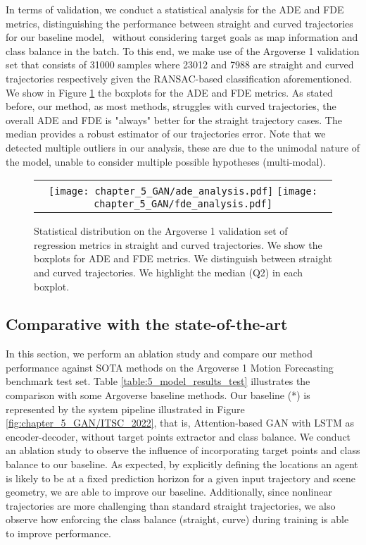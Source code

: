 In terms of validation, we conduct a statistical analysis for the ADE and FDE metrics, distinguishing the performance between straight and curved trajectories for our baseline model, \ie \ without considering target goals as map information and class balance in the batch. To this end, we make use of the Argoverse 1 validation set that consists of 31000 samples where 23012 and 7988 are straight and curved trajectories respectively given the RANSAC-based classification aforementioned. We show in Figure \ref{fig:chapter_5_GAN/boxplots} the boxplots for the ADE and FDE metrics. As stated before, our method, as most methods, struggles with curved trajectories, the overall ADE and FDE is "always" better for the straight trajectory cases. The median provides a robust estimator of our trajectories error. Note that we detected multiple outliers in our analysis, these are due to the unimodal nature of the model, unable to consider multiple possible hypotheses (multi-modal). 

\begin{figure}[!ht]
	\centering
	\setlength{\tabcolsep}{2.0pt}
	\begin{tabular}{c}
		\texttt{[image: chapter\_5\_GAN/ade\_analysis.pdf]} %
		\texttt{[image: chapter\_5\_GAN/fde\_analysis.pdf]}\tabularnewline
	\end{tabular}
	\caption[Statistical distribution on the Argoverse 1 validation set of regression metrics in straight and curved trajectories]{Statistical distribution on the Argoverse 1 validation set of regression metrics in straight and curved trajectories. We show the boxplots for ADE and FDE metrics. We distinguish between straight and curved trajectories. We highlight the median (Q2) in each boxplot.}
	\label{fig:chapter_5_GAN/boxplots}
\end{figure}

\subsection{Comparative with the state-of-the-art}
\label{subsec:5_model_results}

In this section, we perform an ablation study and compare our method performance against \ac{SOTA} methods on the Argoverse 1 Motion Forecasting benchmark test set. Table \ref{table:5_model_results_test} illustrates the comparison with some Argoverse baseline methods. Our baseline (*) is represented by the system pipeline illustrated in Figure \ref{fig:chapter_5_GAN/ITSC_2022}, that is, Attention-based \ac{GAN} with \ac{LSTM} as encoder-decoder, without target points extractor and class balance. We conduct an ablation study to observe the influence of incorporating target points and class balance to our baseline. As expected, by explicitly defining the locations an agent is likely to be at a fixed prediction horizon for a given input trajectory and scene geometry, we are able to improve our baseline. Additionally, since nonlinear trajectories are more challenging than standard straight trajectories, we also observe how enforcing the class balance (straight, curve) during training is able to improve performance.

